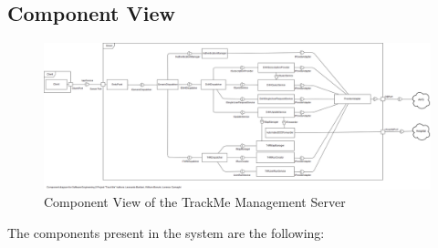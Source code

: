 {\color{secblue}\subsection{Component View}}
\begin{figure}[H]
    \includegraphics[width=\linewidth, keepaspectratio]{./Images/component_diagram.png}
    \centering
    \caption{Component View of the TrackMe Management Server}
    \label{fig:depview}
  \end{figure}
The components present in the system are the following:
